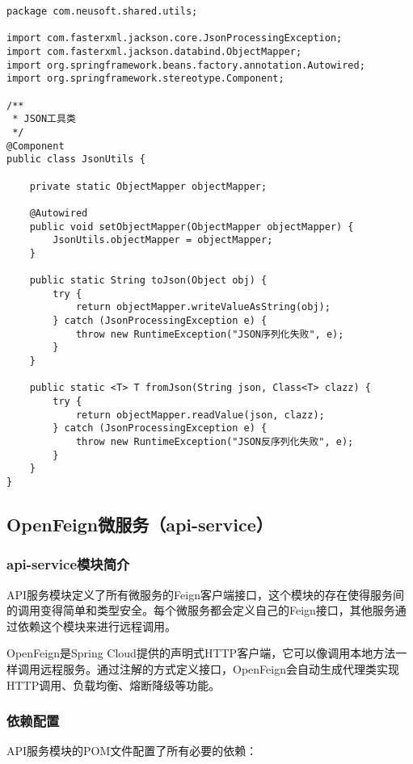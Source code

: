 \documentclass[a4paper,12pt]{article}
\begin{document}
\begin{lstlisting}[caption=JSON工具类]
package com.neusoft.shared.utils;

import com.fasterxml.jackson.core.JsonProcessingException;
import com.fasterxml.jackson.databind.ObjectMapper;
import org.springframework.beans.factory.annotation.Autowired;
import org.springframework.stereotype.Component;

/**
 * JSON工具类
 */
@Component
public class JsonUtils {
    
    private static ObjectMapper objectMapper;
    
    @Autowired
    public void setObjectMapper(ObjectMapper objectMapper) {
        JsonUtils.objectMapper = objectMapper;
    }
    
    public static String toJson(Object obj) {
        try {
            return objectMapper.writeValueAsString(obj);
        } catch (JsonProcessingException e) {
            throw new RuntimeException("JSON序列化失败", e);
        }
    }
    
    public static <T> T fromJson(String json, Class<T> clazz) {
        try {
            return objectMapper.readValue(json, clazz);
        } catch (JsonProcessingException e) {
            throw new RuntimeException("JSON反序列化失败", e);
        }
    }
}
\end{lstlisting}

\subsection{OpenFeign微服务（api-service）}

\subsubsection{api-service模块简介}

API服务模块定义了所有微服务的Feign客户端接口，这个模块的存在使得服务间的调用变得简单和类型安全。每个微服务都会定义自己的Feign接口，其他服务通过依赖这个模块来进行远程调用。

OpenFeign是Spring Cloud提供的声明式HTTP客户端，它可以像调用本地方法一样调用远程服务。通过注解的方式定义接口，OpenFeign会自动生成代理类实现HTTP调用、负载均衡、熔断降级等功能。

\subsubsection{依赖配置}

API服务模块的POM文件配置了所有必要的依赖：
\end{document}
